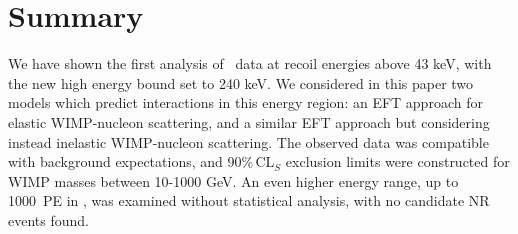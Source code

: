 \section{Summary}
We have shown the first analysis of \Xehund\ data at recoil energies above 43 keV, with the new high energy bound set to 240 keV. We considered in this paper two models which predict interactions in this energy region: an EFT approach for elastic WIMP-nucleon scattering, and a similar EFT approach but considering instead inelastic WIMP-nucleon scattering. The observed data was compatible with background expectations, and 90\%\,CL$_S$ exclusion limits were constructed for WIMP masses between 10-1000 GeV. An even higher energy range, up to 1000~PE in \cSi{}, was examined without statistical analysis, with no candidate NR events found.
